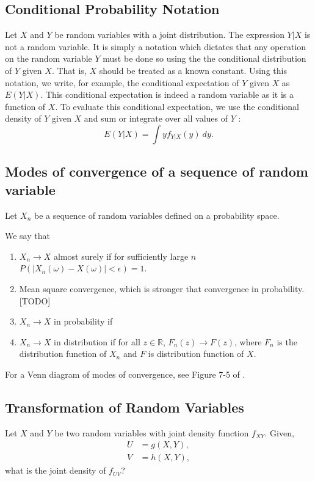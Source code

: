 \documentclass{amsart}
\theoremstyle{plain}
\numberwithin{equation}{section}
\begin{document}
\subsection*{Conditional Probability Notation}
Let $X$ and $Y$ be random variables with 
a joint distribution. The expression $Y|X$ is not a random
variable. It is simply a notation which dictates that any 
operation on the random variable $Y$ must be done so
using the the conditional distribution of 
$Y$ given $X$. That is, $X$ should 
be treated as a known constant. 
Using this notation, we write, for example,  the conditional expectation of 
$Y$ given $X$ as $E(Y|X)$. 
This conditional expectation is indeed a random variable 
as it is a function of $X$. To evaluate this conditional expectation,
we use the conditional density of $Y$ given $X$ and sum or 
integrate over all values of $Y$ \cite{blitzstein_harvard_110_final_review}:
\begin{equation*}
E(Y|X) = \int y f_{Y|X}(y) \: dy.
\end{equation*}


\subsection{Modes of convergence of a sequence of random variable}
Let $X_n$ be a sequence of random variables defined on a probability 
space. 

We say that 
\begin{enumerate}
\item $X_n \to X$ almost surely 
if for sufficiently large $n$
$P(|X_n(\omega)-X(\omega)| < \epsilon) = 1$.

\item Mean square convergence, which is 
stronger that convergence in probability. 
[TODO]


\item $X_n \to X$ in probability 
if 

\item $X_n \to X$ in distribution
if for all $z \in \mathbb{R}$, 
$F_n(z) \to F(z)$, where
$F_n$ is the distribution function of 
$X_n$ and $F$ is distribution function 
of $X$.


\end{enumerate}

For a Venn diagram of modes of convergence, 
see Figure 7-5 of \cite{papoulis2002probability}.

\subsection{Transformation of Random Variables}
Let $X$ and $Y$ be two random variables with joint 
density function $f_{XY}$. Given,
\begin{align*}
U &= g(X, Y),\\
V &= h(X, Y),
\end{align*}
what is the joint density of $f_{UV}$?
\end{document}
